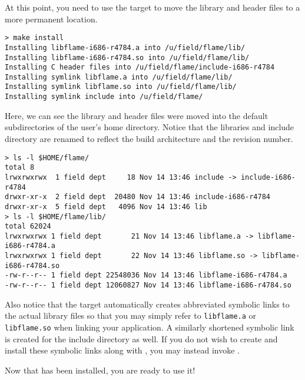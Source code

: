 At this point, you need to use the \install target to move the library
and header files to a more permanent location.

\begin{Verbatim}[frame=single,framesep=2.5mm,xleftmargin=5mm,commandchars=\\\{\},fontsize=\footnotesize]
> make install
Installing libflame-i686-r4784.a into /u/field/flame/lib/
Installing libflame-i686-r4784.so into /u/field/flame/lib/
Installing C header files into /u/field/flame/include-i686-r4784
Installing symlink libflame.a into /u/field/flame/lib/
Installing symlink libflame.so into /u/field/flame/lib/
Installing symlink include into /u/field/flame/
\end{Verbatim}

\noindent
Here, we can see the library and header files were moved into the default
subdirectories of the user's home directory.
Notice that the libraries and include directory are renamed to reflect
the build architecture and the revision number.

\begin{Verbatim}[frame=single,framesep=2.5mm,xleftmargin=5mm,commandchars=\\\{\},fontsize=\footnotesize]
> ls -l $HOME/flame/
total 8
lrwxrwxrwx  1 field dept     18 Nov 14 13:46 include -> include-i686-r4784
drwxr-xr-x  2 field dept  20480 Nov 14 13:46 include-i686-r4784
drwxr-xr-x  5 field dept   4096 Nov 14 13:46 lib
> ls -l $HOME/flame/lib/
total 62024
lrwxrwxrwx 1 field dept       21 Nov 14 13:46 libflame.a -> libflame-i686-r4784.a
lrwxrwxrwx 1 field dept       22 Nov 14 13:46 libflame.so -> libflame-i686-r4784.so
-rw-r--r-- 1 field dept 22548036 Nov 14 13:46 libflame-i686-r4784.a
-rw-r--r-- 1 field dept 12060827 Nov 14 13:46 libflame-i686-r4784.so
\end{Verbatim}

\noindent
Also notice that the \install target automatically creates abbreviated symbolic
links to the actual library files so that you may simply refer to
{\tt libflame.a} or {\tt libflame.so} when linking your application.
A similarly shortened symbolic link is created for the include directory
as well.
If you do not wish to create and install these symbolic links along with
\libflamens, you may instead invoke \installwithoutsymlinksns.

Now that \libflame has been installed, you are ready to use it!

